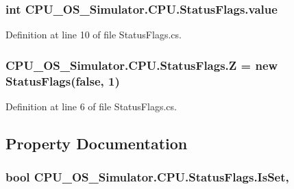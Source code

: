 \subsubsection[{value}]{\setlength{\rightskip}{0pt plus 5cm}int C\+P\+U\+\_\+\+O\+S\+\_\+\+Simulator.\+C\+P\+U.\+Status\+Flags.\+value\hspace{0.3cm}{\ttfamily [private]}}\label{class_c_p_u___o_s___simulator_1_1_c_p_u_1_1_status_flags_a289edb09fa9bef509188db5619be8dee}


Definition at line 10 of file Status\+Flags.\+cs.

\hypertarget{class_c_p_u___o_s___simulator_1_1_c_p_u_1_1_status_flags_aa38943c12054a3f613161ecde5580f27}{}
\subsubsection[{Z}]{ C\+P\+U\+\_\+\+O\+S\+\_\+\+Simulator.\+C\+P\+U.\+Status\+Flags.\+Z = new {\bf Status\+Flags}(false, 1)\hspace{0.3cm}{\ttfamily [static]}}\label{class_c_p_u___o_s___simulator_1_1_c_p_u_1_1_status_flags_aa38943c12054a3f613161ecde5580f27}


Definition at line 6 of file Status\+Flags.\+cs.



\subsection{Property Documentation}
\hypertarget{class_c_p_u___o_s___simulator_1_1_c_p_u_1_1_status_flags_a96ee01f7bcf0a1d0810c75705e462b43}{}
\subsubsection[{Is\+Set}]{\setlength{\rightskip}{0pt plus 5cm}bool C\+P\+U\+\_\+\+O\+S\+\_\+\+Simulator.\+C\+P\+U.\+Status\+Flags.\+Is\+Set\hspace{0.3cm}{\ttfamily [get]}, {\ttfamily [set]}}\label{class_c_p_u___o_s___simulator_1_1_c_p_u_1_1_status_flags_a96ee01f7bcf0a1d0810c75705e462b43}


